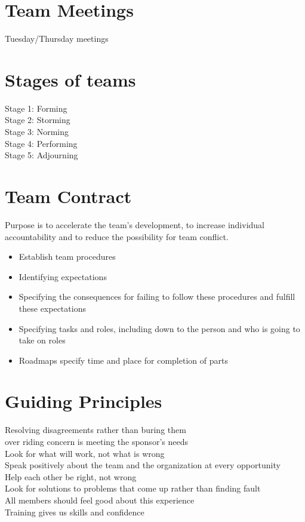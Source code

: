 \section*{Team Meetings}
\indent\indent Tuesday/Thursday meetings\\
\indent\indent 

\section*{Stages of teams}
\noindent Stage 1: Forming\\
\noindent Stage 2: Storming\\
\noindent Stage 3: Norming\\
\noindent Stage 4: Performing\\ %
\noindent Stage 5: Adjourning\\

\section*{Team Contract}
\indent\indent Purpose is to accelerate the team's development, to increase individual accountability and to reduce the possibility for team conflict.\\


\begin{itemize}
  \itemsep-1.5em
  \item Establish team procedures\\
  \item Identifying expectations\\
  \item Specifying the consequences for failing to follow these procedures and fulfill these expectations\\
  \item Specifying tasks and roles, including down to the person and who is going to take on roles\\
  \item Roadmaps \arr specify time and place for completion of parts\\
\end{itemize}

\section*{Guiding Principles}
\noindent Resolving disagreements rather than buring them\\
over riding concern is meeting the sponsor's needs\\
Look for what will work, not what is wrong\\
Speak positively about the team and the organization at every opportunity\\
Help each other be right, not wrong\\
Look for solutions to problems that come up rather than finding fault\\
All members should feel good about this experience\\
Training gives us skills and confidence\\
